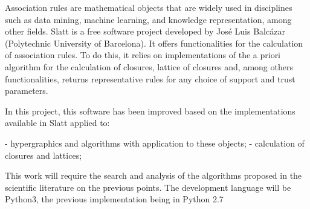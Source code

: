Association rules are mathematical objects that are widely used in disciplines such as data mining, machine learning, and knowledge representation, among other fields.
Slatt is a free software project developed by José Luis Balcázar (Polytechnic University of Barcelona). It offers functionalities for the calculation of association rules. To do this, it relies on implementations of the a priori algorithm for the calculation of closures, lattice of closures and, among others
functionalities, returns representative rules for any choice of support and trust parameters.

In this project, this software has been improved based on the implementations available in Slatt
applied to:

- hypergraphics and algorithms with application to these objects;
- calculation of closures and lattices;

This work will require the search and analysis of the algorithms proposed in the scientific literature on the previous points.
The development language will be Python3, the previous implementation being in Python 2.7
